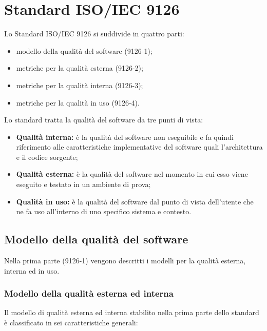 \documentclass[PianoDiQualifica.tex]{subfiles}
\begin{document}
\hypertarget{ISOIEC}{\section{Standard ISO/IEC 9126}}
Lo Standard ISO/IEC 9126 si suddivide in quattro parti:
\begin{itemize}
\item modello della qualità del software (9126-1);
\item metriche per la qualità esterna (9126-2);
\item metriche per la qualità interna (9126-3);
\item metriche per la qualità in uso (9126-4).
\end{itemize}

Lo standard tratta la qualità del software da tre punti di vista:
\begin{itemize}
\item \textbf{Qualità interna:}  è la qualità del software non eseguibile e
fa quindi riferimento alle caratteristiche implementative del software
quali l’architettura e il codice sorgente;
\item \textbf{Qualità esterna:} è la qualità del software nel
momento in cui esso viene eseguito e testato in un ambiente di prova;
\item \textbf{Qualità in uso:} è la qualità del software dal punto di vista dell’utente che ne fa uso all’interno di uno specifico sistema e contesto.
\end{itemize}
\subsection{Modello della qualità del software}
Nella prima parte (9126-1) vengono descritti i modelli per la qualità esterna, interna
ed in uso.

\subsubsection{Modello della qualità esterna ed interna}

Il modello di qualità esterna ed interna stabilito nella prima parte dello
standard è classificato in sei caratteristiche generali:
\end{document}
